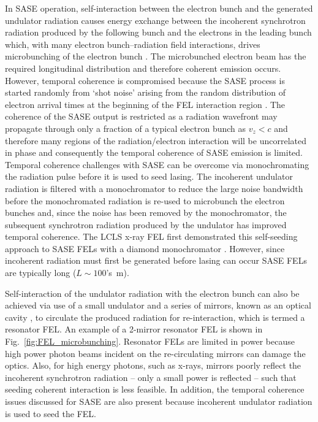 \documentclass[../main.tex]{subfiles}
\begin{document}
In SASE operation, self-interaction between the electron bunch and the generated undulator radiation causes energy exchange between the incoherent synchrotron radiation produced by the following bunch and the electrons in the leading bunch which, with many electron bunch--radiation field interactions, drives microbunching of the electron bunch \cite{kondratenko1980generating,bonifacio1984collective}. The microbunched electron beam has the required longitudinal distribution and therefore coherent emission occurs. However, temporal coherence is compromised because the SASE process is started randomly from `shot noise' arising from the random distribution of
electron arrival times at the beginning of the FEL interaction region \cite{mcneil2003unified}. The coherence of the SASE output is restricted as a radiation wavefront may propagate through only a fraction of a typical electron bunch as $v_{z} < c$ and therefore many regions of the radiation/electron interaction will be uncorrelated in phase \cite{thompson2010improved} and consequently the temporal coherence of SASE emission is limited. Temporal coherence challenges with SASE can be overcome via monochromating the radiation pulse before it is used to seed lasing. The incoherent undulator radiation is filtered with a monochromator to reduce the large noise bandwidth before the monochromated radiation is re-used to microbunch the electron bunches and, since the noise has been removed by the monochromator, the subsequent synchrotron radiation produced by the undulator has improved temporal coherence. The LCLS x-ray FEL first demonstrated this self-seeding approach to SASE FELs with a diamond monochromator \cite{emma2010first}. However, since incoherent radiation must first be generated before lasing can occur SASE FELs are typically long ($L\sim 100$'s~\si{\meter}).

Self-interaction of the undulator radiation with the electron bunch can also be achieved via use of a small undulator and a series of mirrors, known as an optical cavity \cite{petrillo2012photon}, to circulate the produced radiation for re-interaction, which is termed a resonator FEL. An example of a 2-mirror resonator FEL is shown in Fig.~\ref{fig:FEL_microbunching}. Resonator FELs are limited in power because high power photon beams incident on the re-circulating mirrors can damage the optics. Also, for high energy photons, such as x-rays, mirrors poorly reflect the incoherent synchrotron radiation -- only a small power is reflected -- such that seeding coherent interaction is less feasible. In addition, the temporal coherence issues discussed for SASE are also present because incoherent undulator radiation is used to seed the FEL.
\end{document}
